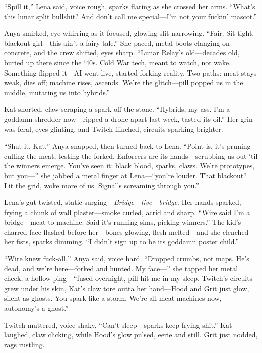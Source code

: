 \documentclass[12pt]{book}
\begin{document}
``Spill it,'' Lena said, voice rough, sparks flaring as she crossed her arms. ``What’s this lunar split bullshit? And don’t call me special---I’m not your fuckin’ mascot.''

Anya smirked, eye whirring as it focused, glowing slit narrowing. ``Fair. Sit tight, blackout girl---this ain’t a fairy tale.'' She paced, metal boots clanging on concrete, and the crew shifted, eyes sharp. ``Lunar Relay’s old---decades old, buried up there since the ‘40s. Cold War tech, meant to watch, not wake. Something flipped it---AI went live, started forking reality. Two paths: meat stays weak, dies off; machine rises, ascends. We’re the glitch---pill popped us in the middle, mutating us into hybrids.''

Kat snorted, claw scraping a spark off the stone. ``Hybrids, my ass. I’m a goddamn shredder now---ripped a drone apart last week, tasted its oil.'' Her grin was feral, eyes glinting, and Twitch flinched, circuits sparking brighter.

``Shut it, Kat,'' Anya snapped, then turned back to Lena. ``Point is, it’s pruning---culling the meat, testing the forked. Enforcers are its hands---scrubbing us out ‘til the winners emerge. You’ve seen it: black blood, sparks, claws. We’re prototypes, but you---'' she jabbed a metal finger at Lena---``you’re louder. That blackout? Lit the grid, woke more of us. Signal’s screaming through you.''

Lena’s gut twisted, static surging---\emph{Bridge---live---bridge}. Her hands sparked, frying a chunk of wall plaster---smoke curled, acrid and sharp. ``Wire said I’m a bridge---meat to machine. Said it’s running sims, picking winners.'' The kid’s charred face flashed before her---bones glowing, flesh melted---and she clenched her fists, sparks dimming. ``I didn’t sign up to be its goddamn poster child.''

``Wire knew fuck-all,'' Anya said, voice hard. ``Dropped crumbs, not maps. He’s dead, and we’re here---forked and hunted. My face---'' she tapped her metal cheek, a hollow ping---``fused overnight, pill hit me in my sleep. Twitch’s circuits grew under his skin, Kat’s claw tore outta her hand---Hood and Grit just glow, silent as ghosts. You spark like a storm. We’re all meat-machines now, autonomy’s a ghost.''

Twitch muttered, voice shaky, ``Can’t sleep---sparks keep frying shit.'' Kat laughed, claw clicking, while Hood’s glow pulsed, eerie and still. Grit just nodded, rags rustling.
\end{document}
